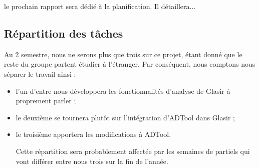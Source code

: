    le prochain rapport sera dédié à la planification. Il détaillera... %


	\subsection{Répartition des tâches}
	Au 2 semestre, nous ne serons plus que trois %
	sur ce projet, étant donné que le reste du groupe partent étudier à l'étranger. Par conséquent, nous comptons nous séparer le travail ainsi :
	\begin{itemize} %
	\item l'un d'entre nous développera les fonctionnalités d'analyse de Glasir à proprement parler ;
	\item le deuxième se tournera plutôt sur l'intégration d'ADTool dans Glasir ;
	\item le troisième apportera les modifications à ADTool.
	
	Cette répartition sera probablement affectée par les semaines de partiels qui vont différer entre nous trois sur la fin de l'année.
	\end{itemize}
